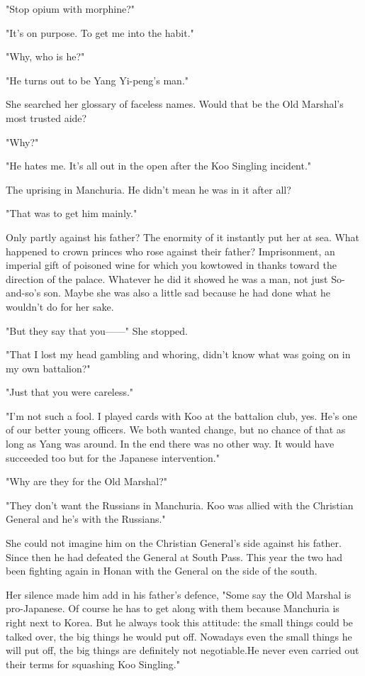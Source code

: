 \par "Stop opium with morphine?"
\par "It's on purpose. To get me into the habit."
\par "Why, who is he?"
\par "He turns out to be Yang Yi-peng's man."
\par She searched her glossary of faceless names. Would that be the Old Marshal's most trusted aide?
\par "Why?"
\par "He hates me. It's all out in the open after the Koo Singling incident."
\par The uprising in Manchuria. He didn't mean he was in it after all?
\par "That was to get him mainly."
\par Only partly against his father? The enormity of it instantly put her at sea. What happened to crown princes who rose against their father? Imprisonment, an imperial gift of poisoned wine for which you kowtowed in thanks toward the direction of the palace. Whatever he did it showed he was a man, not just So-and-so's son. Maybe she was also a little sad because he had done what he wouldn't do for her sake.
\par "But they say that you——" She stopped.
\par "That I lost my head gambling and whoring, didn't know what was going on in my own battalion?"
\par "Just that you were careless."
\par "I'm not such a fool. I played cards with Koo at the battalion club, yes. He's one of our better young officers. We both wanted change, but no chance of that as long as Yang was around. In the end there was no other way. It would have succeeded too but for the Japanese intervention."
\par "Why are they for the Old Marshal?"
\par "They don't want the Russians in Manchuria. Koo was allied with the Christian General and he's with the Russians."
\par She could not imagine him on the Christian General's side against his father. Since then he had defeated the General at South Pass. This year the two had been fighting again in Honan with the General on the side of the south.
\par Her silence made him add in his father's defence, "Some say the Old Marshal is pro-Japanese. Of course he has to get along with them because Manchuria is right next to Korea. But he always took this attitude: the small things could be talked over, the big things he would put off. Nowadays even the small things he will put off, the big things are definitely not negotiable.He never even carried out their terms for squashing Koo Singling."
